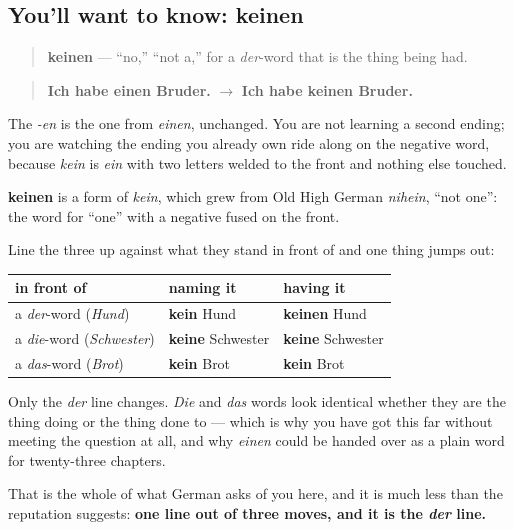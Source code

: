 \subsection*{You'll want to know: keinen}
\begin{quote}
\textbf{keinen} — \textquotedblleft{}no,\textquotedblright{} \textquotedblleft{}not a,\textquotedblright{} for a \emph{der}-word that is the thing being had.
\end{quote}

\begin{quote}
\textbf{Ich habe einen Bruder.} $\to$ \textbf{Ich habe keinen Bruder.}
\end{quote}

The \emph{-en} is the one from \emph{einen}, unchanged. You are not learning a second ending; you are watching the ending you already own ride along on the negative word, because \emph{kein} is \emph{ein} with two letters welded to the front and nothing else touched.

\begin{cousinweb}
\textbf{keinen} is a form of \emph{kein}, which grew from Old High German \emph{nihein}, \textquotedblleft{}not one\textquotedblright{}: the word for \textquotedblleft{}one\textquotedblright{} with a negative fused on the front.
\end{cousinweb}

\begin{grammarlens}[title={Grammar Lens: three shapes, and the one that moves}]
Line the three up against what they stand in front of and one thing jumps out:

\noindent
\begin{tabularx}{\linewidth}{@{}>{\raggedright\arraybackslash}X>{\raggedright\arraybackslash}X>{\raggedright\arraybackslash}X@{}}
\toprule
\textbf{in front of} & \textbf{naming it} & \textbf{having it} \\
\midrule
a \emph{der}-word (\emph{Hund}) & \textbf{kein} Hund & \textbf{keinen} Hund \\
a \emph{die}-word (\emph{Schwester}) & \textbf{keine} Schwester & \textbf{keine} Schwester \\
a \emph{das}-word (\emph{Brot}) & \textbf{kein} Brot & \textbf{kein} Brot \\
\bottomrule
\end{tabularx}

Only the \emph{der} line changes. \emph{Die} and \emph{das} words look identical whether they are the thing doing or the thing done to — which is why you have got this far without meeting the question at all, and why \emph{einen} could be handed over as a plain word for twenty-three chapters.

That is the whole of what German asks of you here, and it is much less than the reputation suggests: \textbf{one line out of three moves, and it is the \emph{der} line.}
\end{grammarlens}

